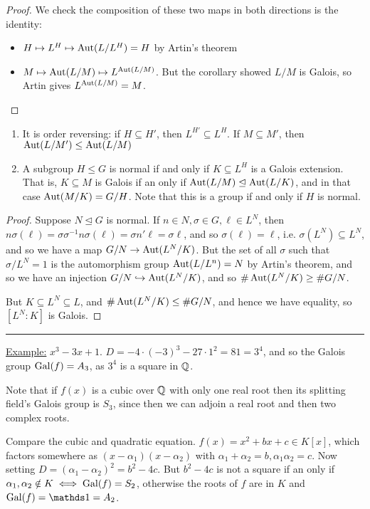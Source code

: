 \documentclass[10pt,a4paper]{article}
\begin{document}
\begin{proof}
We check the composition of these two maps in both directions is the identity:
\begin{itemize}
\item $H \mapsto L^H \mapsto \operatorname{Aut}(L/L^H) = H$ by Artin's theorem
\item $M \mapsto \operatorname{Aut}(L/M) \mapsto L^{\operatorname{Aut}(L/M)}$. But the corollary showed $L/M$ is Galois, so Artin gives $L^{\operatorname{Aut}(L/M)} = M$.
\end{itemize}
\end{proof}
\begin{theorem}\item
\begin{enumerate}
\item It is order reversing: if $H \subseteq H'$, then $L^{H'} \subseteq L^H$. If $M\subseteq M'$, then $\operatorname{Aut}(L/M') \leq \operatorname{Aut}(L/M)$

\item A subgroup $H \leq G$ is normal if and only if $K \subseteq L^H$ is a Galois extension. That is, $K \subseteq M$ is Galois if an only if $\operatorname{Aut}(L/M) \trianglelefteq \operatorname{Aut}(L/K)$, and in that case $\operatorname{Aut}(M/K) = G/H$. Note that this is a group if and only if $H$ is normal.
\end{enumerate}
\end{theorem}
\begin{proof}
Suppose $N \trianglelefteq G$ is normal. If $n \in N, \sigma \in G, \ell \in L^N$, then $n\sigma(\ell) = \sigma \sigma^{-1} n \sigma(\ell) = \sigma n' \ell = \sigma \ell$, and so $\sigma(\ell) = \ell$, i.e. $\sigma(L^N) \subseteq L^N$, and so we have a map $G/N \to \operatorname{Aut}(L^N/K)$. But the set of all $\sigma$ such that $\sigma/L^N = 1$ is the automorphism group $\operatorname{Aut}(L/L^n) = N$ by Artin's theorem, and so we have an injection $G/N \hookrightarrow \operatorname{Aut}(L^N/K)$, and so $\#\operatorname{Aut}(L^N/K) \geq \#G/N$.

But $K \subseteq L^N \subseteq L$, and $\#\operatorname{Aut}(L^N/K) \leq \#G/N$, and hence we have equality, so $[L^N:K]$ is Galois.
\end{proof}
\hrule
\underline{Example:} $x^3 - 3x + 1$. $D = -4\cdot (-3)^3 - 27\cdot 1^2 = 81 = 3^4$, and so the Galois group $\operatorname{Gal}(f) = A_3$, as $3^4$ is a square in $\mathbb{Q}$.

Note that if $f(x)$ is a cubic over $\mathbb{Q}$ with only one real root then its splitting field's Galois group is $S_3$, since then we can adjoin a real root and then two complex roots.

Compare the cubic and quadratic equation. $f(x) = x^2 + bx + c \in K[x]$, which factors somewhere as $(x-\alpha_1)(x-\alpha_2)$ with $\alpha_1+\alpha_2 = b, \alpha_1\alpha_2 = c$. Now setting $D = (\alpha_1-\alpha_2)^2 = b^2-4c$. But $b^2-4c$ is not a square if an only if $\alpha_1, \alpha_2 \notin K \iff \operatorname{Gal}(f) = S_2$, otherwise the roots of $f$ are in $K$ and $\Gal(f) = \one = A_2$.
\end{document}
